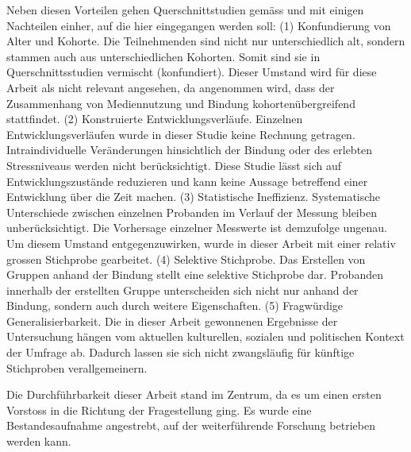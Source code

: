 Neben diesen Vorteilen gehen Querschnittstudien gemäss  und  mit einigen Nachteilen einher, auf die hier eingegangen werden soll: (1) Konfundierung von Alter und Kohorte. Die Teilnehmenden sind nicht nur unterschiedlich alt, sondern stammen auch aus unterschiedlichen Kohorten. Somit sind sie in Querschnittsstudien vermischt (konfundiert). Dieser Umstand wird für diese Arbeit als nicht relevant angesehen, da angenommen wird, dass der Zusammenhang von Mediennutzung und Bindung kohortenübergreifend stattfindet. (2) Konstruierte Entwicklungsverläufe. Einzelnen Entwicklungsverläufen wurde in dieser Studie keine Rechnung getragen. Intraindividuelle Veränderungen hinsichtlich der Bindung oder des erlebten Stressniveaus werden nicht berücksichtigt. Diese Studie lässt sich auf Entwicklungszustände reduzieren und kann keine Aussage betreffend einer Entwicklung über die Zeit machen. (3) Statistische Ineffizienz. Systematische Unterschiede zwischen einzelnen Probanden im Verlauf der Messung bleiben unberücksichtigt. Die Vorhersage einzelner Messwerte ist demzufolge ungenau. Um diesem Umstand entgegenzuwirken, wurde in dieser Arbeit mit einer relativ grossen Stichprobe gearbeitet. (4) Selektive Stichprobe. Das Erstellen von Gruppen anhand der Bindung stellt eine selektive Stichprobe dar. Probanden innerhalb der erstellten Gruppe unterscheiden sich nicht nur anhand der Bindung, sondern auch durch weitere Eigenschaften. (5) Fragwürdige Generalisierbarkeit. Die in dieser Arbeit gewonnenen Ergebnisse der Untersuchung hängen vom aktuellen kulturellen, sozialen und politischen Kontext der Umfrage ab. Dadurch lassen sie sich nicht zwangsläufig für künftige Stichproben verallgemeinern. 

Die Durchführbarkeit dieser Arbeit stand im Zentrum, da es um einen ersten Vorstoss in die Richtung der Fragestellung ging. Es wurde eine Bestandesaufnahme angestrebt, auf der weiterführende Forschung betrieben werden kann.

